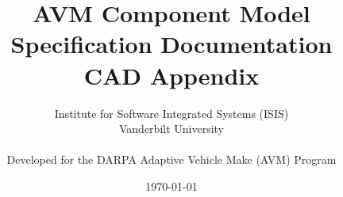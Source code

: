\documentclass{report}
\begin{document}
\title{AVM Component Model Specification Documentation\\CAD Appendix}
\author{Institute for Software Integrated Systems (ISIS)\\
	Vanderbilt University\\
	\\
	Developed for the DARPA Adaptive Vehicle Make (AVM) Program}
\date{\today}


\maketitle

\tableofcontents


\end{document}
